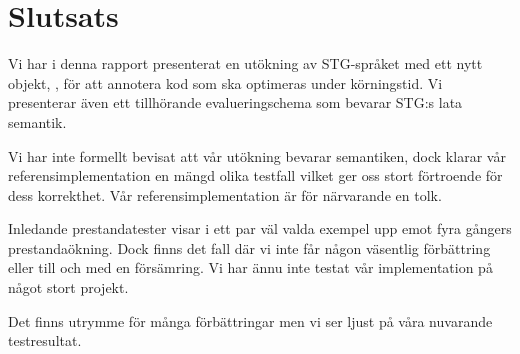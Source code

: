 \documentclass[Rapport]{subfiles}
\begin{document}
\chapter{Slutsats}
\label{sec:Slutsats}






Vi har i denna rapport presenterat en utökning av STG-språket med ett nytt objekt, , för att annotera kod som ska optimeras under körningstid. Vi presenterar även ett tillhörande evalueringschema som bevarar STG:s lata semantik. 

Vi har inte formellt bevisat att vår utökning bevarar semantiken, dock klarar vår referensimplementation en mängd olika testfall vilket ger oss stort förtroende för dess korrekthet. Vår referensimplementation är för närvarande en tolk. 

Inledande prestandatester visar i ett par väl valda exempel upp emot fyra gångers prestandaökning. Dock finns det fall där vi inte får någon väsentlig förbättring eller till och med en försämring. Vi har ännu inte testat vår implementation på något stort projekt. 

Det finns utrymme för många förbättringar men vi ser ljust på våra nuvarande testresultat.





\end{document}
